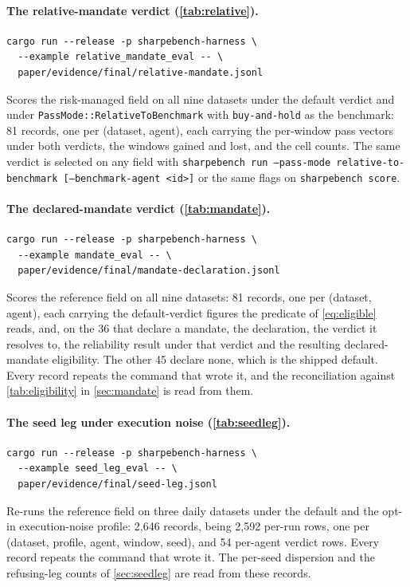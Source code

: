 \paragraph{The relative-mandate verdict (\cref{tab:relative}).}
\begin{verbatim}
cargo run --release -p sharpebench-harness \
  --example relative_mandate_eval -- \
  paper/evidence/final/relative-mandate.jsonl
\end{verbatim}
Scores the risk-managed field on all nine datasets under the default verdict and under \texttt{PassMode::RelativeToBenchmark} with \texttt{buy-and-hold} as the benchmark: 81 records, one per (dataset, agent), each carrying the per-window pass vectors under both verdicts, the windows gained and lost, and the cell counts. The same verdict is selected on any field with \texttt{sharpebench run --pass-mode relative-to-benchmark [--benchmark-agent <id>]} or the same flags on \texttt{sharpebench score}.

\paragraph{The declared-mandate verdict (\cref{tab:mandate}).}
\begin{verbatim}
cargo run --release -p sharpebench-harness \
  --example mandate_eval -- \
  paper/evidence/final/mandate-declaration.jsonl
\end{verbatim}
Scores the reference field on all nine datasets: 81 records, one per (dataset, agent), each carrying the default-verdict figures the predicate of \cref{eq:eligible} reads, and, on the 36 that declare a mandate, the declaration, the verdict it resolves to, the reliability result under that verdict and the resulting declared-mandate eligibility. The other 45 declare none, which is the shipped default. Every record repeats the command that wrote it, and the reconciliation against \cref{tab:eligibility} in \cref{sec:mandate} is read from them.

\paragraph{The seed leg under execution noise (\cref{tab:seedleg}).}
\begin{verbatim}
cargo run --release -p sharpebench-harness \
  --example seed_leg_eval -- \
  paper/evidence/final/seed-leg.jsonl
\end{verbatim}
Re-runs the reference field on three daily datasets under the default and the opt-in execution-noise profile: 2{,}646 records, being 2{,}592 per-run rows, one per (dataset, profile, agent, window, seed), and 54 per-agent verdict rows. Every record repeats the command that wrote it. The per-seed dispersion and the refusing-leg counts of \cref{sec:seedleg} are read from these records.

